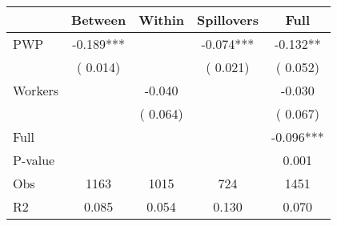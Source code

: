 
\begin{tabular}{l*{4}{c}}\hline&\multicolumn{1}{c}{Between}&\multicolumn{1}{c}{Within}&\multicolumn{1}{c}{Spillovers}&\multicolumn{1}{c}{Full}\\ \hline
 PWP           &             -0.189***      &                                               &       -0.074*** &        -0.132**                            \\ 
                               &        (       0.014)           &                                       &       (       0.021)     &      (       0.052)                                           \\ 
 Workers       &                                               &       -0.040    &                                &            -0.030                            \\ 
                               &                                               & (       0.064)                  &                                        &      (       0.067)                                           \\ 
\hline                                                                                                                                                                                                                                            
 Full                  &                                               &                                               &                                        &            -0.096***                                     \\ 
 P-value               &                                               &                                               &                                        &             0.001                                           \\ 
 Obs                   &               1163               &       1015                       &       724                &              1451                                               \\ 
 R2                    &                      0.085              &              0.054                      &              0.130               &                     0.070                                              \\ 
\hline \end{tabular}                                                                                                                                                                                                              